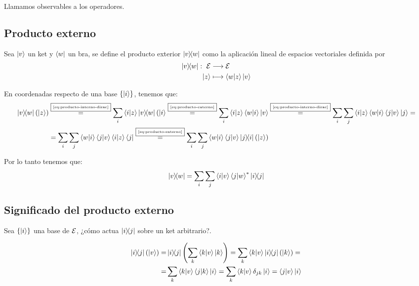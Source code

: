 Llamamos observables a los operadores.

\subsection{Producto externo}\label{subsec:producto-externo}
Sea $\ket{v}$ un ket y $\bra{w}$ un bra, se define el producto exterior $\ketbra{v}{w}$ como la aplicación lineal de espacios vectoriales definida por
\begin{equation}
	\label{eq:producto-externo}
	\begin{split}
		\ketbra{v}{w}:\ \mathcal{E} & \longrightarrow \mathcal{E} \\ \ket{z} & \longmapsto \braket{w}{z}\ket{v}
	\end{split}
\end{equation}

En coordenadas respecto de una base $\qty{\ket{i}}$, tenemos que:
\begin{equation*}
	\begin{split}
		\ketbra{v}{w}(\ket{z}) &\overset{\fbox{\tiny \ref{eq:producto-interno-dirac}}}{=} \sum_{i}\braket{i}{z}\ketbra{v}{w}(\ket{i}\overset{\fbox{\tiny \ref{eq:producto-externo}}}{=}\sum_{i}\braket{i}{z}\braket{w}{i}\ket{v}\overset{\fbox{\tiny \ref{eq:producto-interno-dirac}}}{=}\sum_{i}\sum_{j}\braket{i}{z}\braket{w}{i}\braket{j}{v}\ket{j}= \\
		&=\sum_{i}\sum_{j}\braket{w}{i}\braket{j}{v}\braket{i}{z}\bra{j}\overset{\fbox{\tiny \ref{eq:producto-externo}}}{=}\sum_{i}\sum_{j}\braket{w}{i}\braket{j}{v}\ketbra{j}{i}(\ket{z})\\
	\end{split}
\end{equation*}

Por lo tanto tenemos que:
\begin{equation}
	\label{eq:produto-externo-dirac}
	\ketbra{v}{w} = \sum_{i}\sum_{j}\braket{i}{v}\braket{j}{w}^*\ketbra{i}{j}
\end{equation}

\subsection{Significado del producto externo}\label{subsec:significado-del-producto-externo}

Sea $\qty{\ket{i}}$ una base de $\mathcal{E}$, ¿cómo actua $\ketbra{i}{j}$ sobre un ket arbitrario?.

\begin{equation}
	\label{eq:ketbra_base}
	\begin{split}
		\ketbra{i}{j}\left(\ket{v}\right)= & \ketbra{i}{j}\left(\sum_k{\braket{k}{v}\ket{k}}\right)=\sum_k{\braket{k}{v}\ketbra{i}{j}(\ket{k}}) =\\ =&\sum_k{\braket{k}{v}\braket{j}{k}\ket{i}}=\sum_k{\braket{k}{v}\delta_{jk}\ket{i}}=\braket{j}{v}\ket{i}
	\end{split}
\end{equation}


